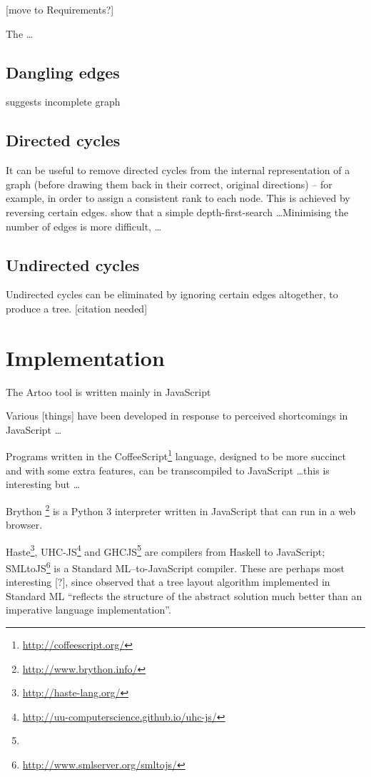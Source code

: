 [move to Requirements?]

The  \ldots



\subsection{Dangling edges}

suggests incomplete graph

\subsection{Directed cycles}

It can be useful to remove directed cycles from the internal representation of a graph
(before drawing them back in their correct, original directions)
-- for example, in order to assign a consistent rank to each node.
This is achieved by reversing certain edges.
\citet{gansner1993} show that a simple depth-first-search \ldots  Minimising the number of edges is more difficult, \citeauthor{gansner1993} \ldots

\subsection{Undirected cycles}

Undirected cycles can be eliminated by ignoring certain edges altogether, to produce a tree.  [citation needed]








\section{Implementation}

The Artoo tool is written mainly in JavaScript 

Various [things] have been developed in response to perceived shortcomings in JavaScript \ldots

Programs written in the CoffeeScript\footnote{\url{http://coffeescript.org/}} language, designed to be more succinct and with some extra features, can be transcompiled to JavaScript \ldots this is interesting but \ldots

Brython \footnote{\url{http://www.brython.info/}} is a Python 3 interpreter written in JavaScript that can run in a web browser. 

Haste\footnote{\url{http://haste-lang.org/}}, UHC-JS\footnote{\url{http://uu-computerscience.github.io/uhc-js/}}
and GHCJS\footnote{} are compilers from Haskell to JavaScript;
SMLtoJS\footnote{\url{http://www.smlserver.org/smltojs/}} is a Standard ML--to-JavaScript compiler.
These are perhaps most interesting [?], since \citet{kennedyfuntrees} observed that a tree layout algorithm implemented in Standard ML ``reflects the structure of the abstract solution much better than an imperative language implementation''.

